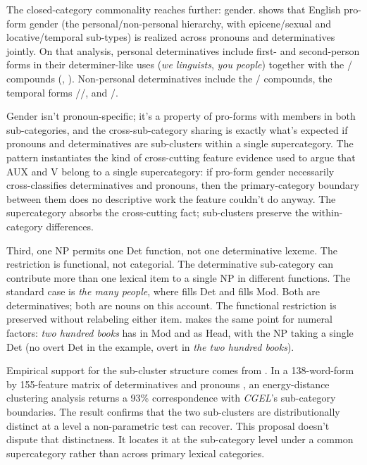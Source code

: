 \documentclass[12pt]{article}
\begin{document}
The closed-category commonality reaches further: gender. \textcite{reynolds2026gender} shows that English pro-form gender (the personal/non-personal hierarchy, with epicene/sexual and locative/temporal sub-types) is realized across pronouns and determinatives jointly. On that analysis, personal determinatives include first- and second-person forms in their determiner-like uses (\textit{we linguists}, \textit{you people}) together with the / compounds (, ). Non-personal determinatives include the / compounds, the temporal forms //, and /.

Gender isn't pronoun-specific; it's a property of pro-forms with members in both sub-categories, and the cross-sub-category sharing is exactly what's expected if pronouns and determinatives are sub-clusters within a single supercategory. The pattern instantiates the kind of cross-cutting feature evidence \textcite[§1.2]{pullumwilson1977} used to argue that AUX and V belong to a single supercategory: if pro-form gender necessarily cross-classifies determinatives and pronouns, then the primary-category boundary between them does no descriptive work the feature couldn't do anyway. The supercategory absorbs the cross-cutting fact; sub-clusters preserve the within-category differences.

Third, one NP permits one Det function, not one determinative lexeme. The restriction is functional, not categorial. The determinative sub-category can contribute more than one lexical item to a single NP in different functions. The standard case is \textit{the many people}, where  fills Det and  fills Mod. Both are determinatives; both are nouns on this account. The functional restriction is preserved without relabeling either item. \textcite{reynolds2026numerals} makes the same point for numeral factors: \textit{two hundred books} has  in Mod and  as Head, with the NP taking a single Det (no overt Det in the example, overt in \textit{the two hundred books}).

Empirical support for the sub-cluster structure comes from \textcite{reynolds2021}. In a 138-word-form by 155-feature matrix of determinatives and pronouns \citep{reynolds2021matrix}, an energy-distance clustering analysis returns a 93\% correspondence with \textit{CGEL}'s sub-category boundaries. The result confirms that the two sub-clusters are distributionally distinct at a level a non-parametric test can recover. This proposal doesn't dispute that distinctness. It locates it at the sub-category level under a common supercategory rather than across primary lexical categories.
\end{document}
